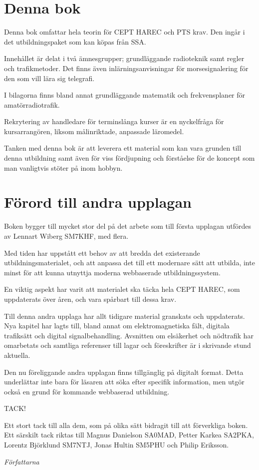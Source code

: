 \section*{Denna bok}

Denna bok omfattar hela teorin för CEPT HAREC och PTS krav.
Den ingår i det utbildningspaket som kan köpas från SSA.

Innehållet är delat i två ämnesgrupper; grundläggande radioteknik
samt regler och trafikmetoder.
Det finns även inlärningsanvisningar för morsesignalering för den
som vill lära sig telegrafi.

I bilagorna finns bland annat grundläggande matematik
och frekvensplaner för amatörradiotrafik.

Rekrytering av handledare för terminslånga kurser är en nyckelfråga för
kursarrangören, liksom målinriktade, anpassade läromedel.

Tanken med denna bok är att leverera ett material som kan vara grunden till
denna utbildning samt även för viss fördjupning och förståelse för de koncept
som man vanligtvis stöter på inom hobbyn.



\clearpage

\section*{Förord till andra upplagan}

Boken bygger till mycket stor del på det arbete som till första upplagan
utfördes av Lennart Wiberg SM7KHF, med flera.

Med tiden har uppstått ett behov av att bredda det existerande
utbildningsmaterialet, och att anpassa det till ett modernare sätt att utbilda,
inte minst för att kunna utnyttja moderna webbaserade utbildningssystem.

En viktig aspekt har varit att materialet ska täcka hela CEPT HAREC,
som uppdaterats över åren, och vara spårbart till dessa krav.

Till denna andra upplaga har allt tidigare material granskats och uppdaterats.
Nya kapitel har lagts till, bland annat om elektromagnetiska fält, digitala
trafiksätt och digital signalbehandling.
Avsnitten om elsäkerhet och nödtrafik har omarbetats och samtliga referenser
till lagar och föreskrifter är i skrivande stund aktuella.

Den nu föreliggande andra upplagan finns tillgänglig på digitalt format.
Detta underlättar inte bara för läsaren att söka efter specifik information,
men utgör också en grund för kommande webbaserad utbildning.



TACK!

Ett stort tack till alla dem, som på olika sätt bidragit till att förverkliga
boken.
Ett särskilt tack riktas till Magnus Danielson SA0MAD, Petter Karkea SA2PKA,
Lorentz Björklund SM7NTJ, Jonas Hultin SM5PHU och Philip Eriksson.

\emph{Författarna}
